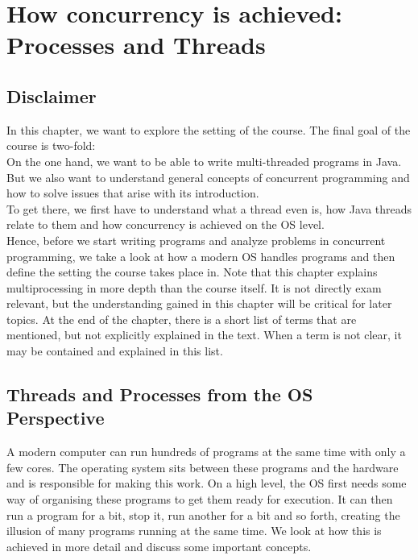 \documentclass[main]{subfiles}
\begin{document}
\section{How concurrency is achieved: Processes and Threads}
\subsection{Disclaimer}
In this chapter, we want to explore the setting of the course. The final goal of the course is two-fold:\\
On the one hand, we want to be able to write multi-threaded programs in Java. But we also want to understand general concepts of concurrent programming and how to solve issues that arise with its introduction.\\
To get there, we first have to understand what a thread even is, how Java threads relate to them and how concurrency is achieved on the OS level.\\
Hence, before we start writing programs and analyze problems in concurrent programming, we take a look at how a modern OS handles programs and then define the setting the course takes place in. Note that this chapter explains multiprocessing in more depth than the course itself. It is not directly exam relevant, but the understanding gained in this chapter will be critical for later topics. At the end of the chapter, there is a short list of terms that are mentioned, but not explicitly explained in the text. When a term is not clear, it may be contained and explained in this list.

\subsection{Threads and Processes from the OS Perspective}
A modern computer can run hundreds of programs at the same time with only a few cores. The operating system sits between these programs and the hardware and is responsible for making this work. On a high level, the OS first needs some way of organising these programs to get them ready for execution. It can then run a program for a bit, stop it, run another for a bit and so forth, creating the illusion of many programs running at the same time. We look at how this is achieved in more detail and discuss some important concepts.
\end{document}
